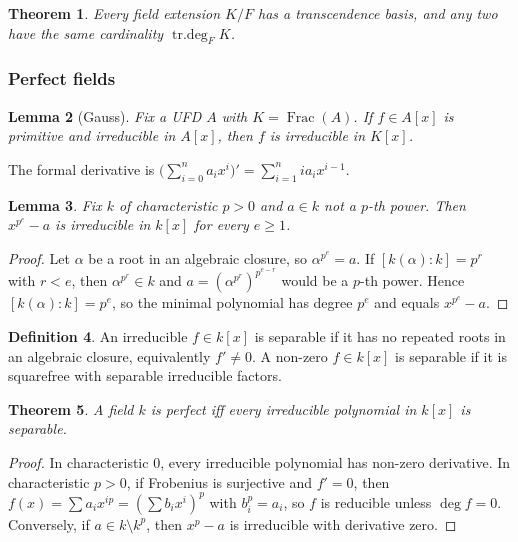 \documentclass[12pt]{article}
\theoremstyle{plain}
\newtheorem{thm}{Theorem}[subsection] %
\newtheorem{lemma}[thm]{Lemma}
\theoremstyle{definition}
\newtheorem{defn}[thm]{Definition} %
\begin{document}
\begin{thm}
Every field extension $K/F$ has a transcendence basis, and any two have the same cardinality $\operatorname{tr.deg}_F K$.
\end{thm}

\subsubsection*{Perfect fields}

\begin{lemma}[Gauss]
Fix a UFD $A$ with $K=\operatorname{Frac}(A)$. If $f\in A[x]$ is primitive and irreducible in $A[x]$, then $f$ is irreducible in $K[x]$.
\end{lemma}

The formal derivative is $\big(\sum_{i=0}^n a_ix^i\big)'=\sum_{i=1}^n ia_ix^{i-1}$.

\begin{lemma}\label{lem:irred_pe_corr}
Fix $k$ of characteristic $p>0$ and $a\in k$ not a $p$-th power. Then $x^{p^e}-a$ is irreducible in $k[x]$ for every $e\ge 1$.
\end{lemma}
\begin{proof}
Let $\alpha$ be a root in an algebraic closure, so $\alpha^{p^e}=a$. If $[k(\alpha):k]=p^r$ with $r<e$, then $\alpha^{p^r}\in k$ and $a=(\alpha^{p^r})^{p^{e-r}}$ would be a $p$-th power. Hence $[k(\alpha):k]=p^e$, so the minimal polynomial has degree $p^e$ and equals $x^{p^e}-a$.
\end{proof}

\begin{defn}
An irreducible $f\in k[x]$ is separable if it has no repeated roots in an algebraic closure, equivalently $f'\ne 0$. A non-zero $f\in k[x]$ is separable if it is squarefree with separable irreducible factors.
\end{defn}

\begin{thm}
A field $k$ is perfect iff every irreducible polynomial in $k[x]$ is separable.
\end{thm}
\begin{proof}
In characteristic $0$, every irreducible polynomial has non-zero derivative. In characteristic $p>0$, if Frobenius is surjective and $f'=0$, then $f(x)=\sum a_ix^{ip}=(\sum b_ix^i)^p$ with $b_i^p=a_i$, so $f$ is reducible unless $\deg f=0$. Conversely, if $a\in k\setminus k^p$, then $x^p-a$ is irreducible with derivative zero.
\end{proof}
\end{document}
